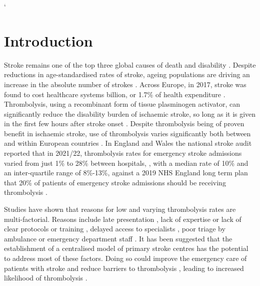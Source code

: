 `\section{Introduction}



Stroke remains one of the top three global causes of death and disability \cite{feigin_global_2021}. Despite reductions in age-standardised rates of stroke, ageing populations are driving an increase in the absolute number of strokes \cite{feigin_global_2021}. Across Europe, in 2017, stroke was found to cost healthcare systems  billion, or 1.7\% of health expenditure \cite{luengo-fernandez_economic_2020}. Thrombolysis, using a recombinant form of tissue plasminogen activator, can significantly reduce the disability burden of ischaemic stroke, so long as it is given in the first few hours after stroke onset \cite{emberson_effect_2014}. Despite thrombolysis being of proven benefit in ischaemic stroke, use of thrombolysis varies significantly both between and within European countries \cite{aguiar_de_sousa_access_2019}. In England and Wales the national stroke audit reported that in 2021/22, thrombolysis rates for emergency stroke admissions varied from just 1\% to 28\% between hospitals, \cite{sentinel_national_stroke_audit_programme_ssnap_2022}, with a median rate of 10\% and an inter-quartile range of 8\%-13\%, against a 2019 NHS England long term plan that 20\% of patients of emergency stroke admissions should be receiving thrombolysis \cite{nhs_long_term_plan_2019}.


Studies have shown that reasons for low and varying thrombolysis rates are multi-factorial. Reasons include late presentation \cite{aguiar_de_sousa_access_2019}, lack of expertise \cite{aguiar_de_sousa_access_2019} or lack of clear protocols or training \cite{carter-jones_stroke_2011}, delayed access to specialists \cite{kamal_delays_2017}, poor triage by ambulance or emergency department staff \cite{carter-jones_stroke_2011}.  It has been suggested that the establishment of a centralised model of primary stroke centres has the potential to address most of these factors. Doing so could improve the emergency care of patients with stroke and reduce barriers to thrombolysis \cite{carter-jones_stroke_2011}, leading to increased likelihood of thrombolysis \cite{lahr_proportion_2012, morris_impact_2014, hunter_impact_2013}. 

